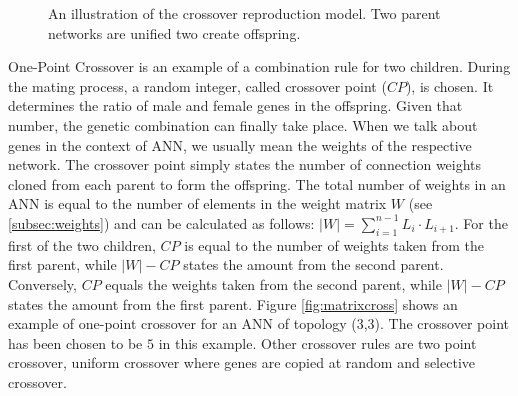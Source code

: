 \documentclass[10pt,a4paper,DIV=11]{scrreprt}
\begin{document}
\begin{figure}
	\centering
	\caption{An illustration of the crossover reproduction model. Two parent networks are unified two create offspring.}
	\label{fig:repro}
\end{figure}

One-Point Crossover is an example of a combination rule for two children.
During the mating process, a random integer, called crossover point ($CP$), is chosen. It determines the ratio of male and female genes in the offspring. 
Given that number, the genetic combination can finally take place. When we talk about genes in the context of ANN, we usually mean the weights 
of the respective network. The crossover point simply states the number of connection weights cloned from each parent to form the offspring.
The total number of weights in an ANN is equal to the number of elements in the weight matrix $W$ (see \ref{subsec:weights}) and can be calculated 
as follows: $|W| = \sum^{n-1}_{i=1} L_i \cdot L_{i+1}$. For the first of the two children, $CP$ is equal to the number of weights taken from the first parent, 
while $|W|-CP$ states the amount from the second parent. Conversely, $CP$ equals the weights taken from the second parent, while $|W|-CP$ states the amount from the first parent.
Figure \ref{fig:matrixcross} shows an example of one-point crossover for an ANN of topology (3,3). The crossover point has been chosen to be $5$ in this example.
Other crossover rules are two point crossover, uniform crossover where genes are copied at random \cite{UNIFORMCROSSOVER} and selective crossover\cite{SELECTCROSSOVER}.
\end{document}
